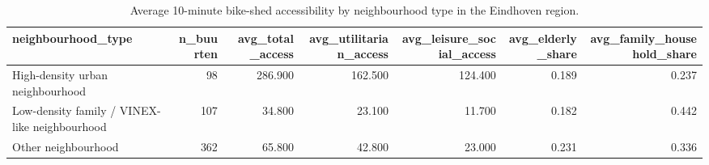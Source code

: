 \begin{table}
\caption{Average 10-minute bike-shed accessibility by neighbourhood type in the Eindhoven region.}
\label{tab:access_neighbourhood_type}
\begin{tabular}{lrrrrrr}
\toprule
neighbourhood\_type & n\_buurten & avg\_total\_access & avg\_utilitarian\_access & avg\_leisure\_social\_access & avg\_elderly\_share & avg\_family\_household\_share \\
\midrule
High-density urban neighbourhood & 98 & 286.900 & 162.500 & 124.400 & 0.189 & 0.237 \\
Low-density family / VINEX-like neighbourhood & 107 & 34.800 & 23.100 & 11.700 & 0.182 & 0.442 \\
Other neighbourhood & 362 & 65.800 & 42.800 & 23.000 & 0.231 & 0.336 \\
\bottomrule
\end{tabular}
\end{table}
